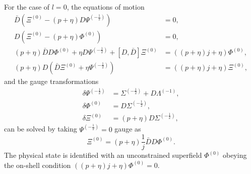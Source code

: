 \documentclass[a4paper,seceq,preprint]{ptptex}
\begin{document}
For the case of $l=0$, the equations of motion
\begin{align}
 \bar D\left(\Xi^{(0)}-(p+\eta)D\Psi^{(-\frac{1}{2})}\right)&=0,
\nonumber\\
D\left(\Xi^{(0)}-(p+\eta)\Phi^{(0)}\right)&=0,\nonumber\\
(p+\eta)\bar DD\Phi^{(0)}+\eta D\Psi^{(-\frac{1}{2})}
+\left[D,\bar D\right]\Xi^{(0)}&=\left((p+\eta)j+\eta\right)\Phi^{(0)},
\nonumber\\
(p+\eta)D\left(\bar D\Xi^{(0)}+\eta\Psi^{(-\frac{1}{2})}\right)&=
\left((p+\eta)j+\eta\right)\Xi^{(0)},
\end{align}
and the gauge transformations
\begin{align}
  \delta\Psi^{(-\frac{1}{2})}&=\Sigma^{(-\frac{1}{2})}
+D\Lambda^{(-1)},\nonumber\\
\delta\Phi^{(0)}&=D\Sigma^{(-\frac{1}{2})},\nonumber\\
\delta\Xi^{(0)}&=(p+\eta)D\Sigma^{(-\frac{1}{2})},
\end{align}
can be solved by taking $\Psi^{(-\frac{1}{2})}=0$ gauge as
\begin{equation}
 \Xi^{(0)}=(p+\eta)\frac{1}{j}\bar DD\Phi^{(0)}.
\end{equation}
The physical state is identified with an unconstrained 
superfield $\Phi^{(0)}$ obeying the on-shell condition
$\left((p+\eta)j+\eta\right)\Phi^{(0)}=0$. 
\end{document}
